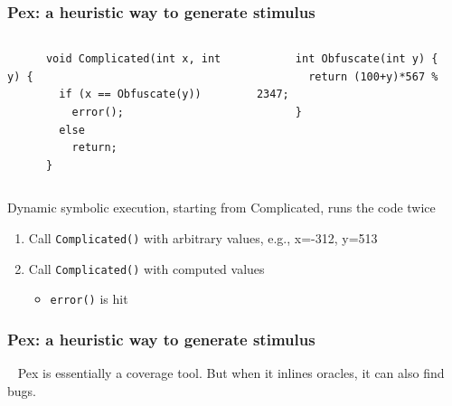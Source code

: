 \documentclass[lualatex]{beamer}
\begin{document}
\begin{frame}[fragile]
  \frametitle{Pex: a heuristic way to generate stimulus}

  \begin{columns}[t]
    \begin{verbatim}
      void Complicated(int x, int y) {
        if (x == Obfuscate(y))
          error();
        else 
          return;
      }
    \end{verbatim}
    \begin{verbatim}
      int Obfuscate(int y) {
        return (100+y)*567 % 2347;
      }
    \end{verbatim}
  \end{columns}
  
  \begin{block}{Dynamic symbolic execution, starting from Complicated, runs the code twice}
    \begin{enumerate}
    \item Call \texttt{Complicated()} with arbitrary values, e.g., x=-312, y=513
    \item Call \texttt{Complicated()} with computed values
      \begin{itemize}
      \item \texttt{error()} is hit
      \end{itemize}
    \end{enumerate}
  \end{block}
\end{frame}

\begin{frame}
  \frametitle{Pex: a heuristic way to generate stimulus}

  \begin{block}{~}
    Pex is essentially a coverage tool.
    But when it inlines oracles, it can also find bugs.
  \end{block}
\end{frame}
\end{document}
